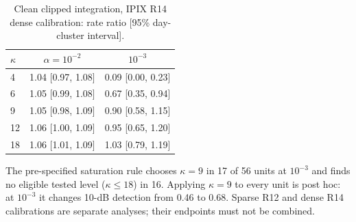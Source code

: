 \documentclass[10pt]{article}
\begin{document}
\begin{table}[htbp]
\centering\small\setlength{\tabcolsep}{4pt}
\caption{Clean clipped integration, IPIX R14 dense calibration: rate ratio [95\% day-cluster interval].}\label{tab:clip_scan}
\begin{tabular}{lcc}
\toprule
$\kappa$ & $\alpha=10^{-2}$ & $10^{-3}$ \\
\midrule
4 & 1.04 [0.97, 1.08] & 0.09 [0.00, 0.23] \\
6 & 1.05 [0.99, 1.08] & 0.67 [0.35, 0.94] \\
9 & 1.05 [0.98, 1.09] & 0.90 [0.58, 1.15] \\
12 & 1.06 [1.00, 1.09] & 0.95 [0.65, 1.20] \\
18 & 1.06 [1.01, 1.09] & 1.03 [0.79, 1.19] \\
\bottomrule
\end{tabular}
\end{table}

The pre-specified saturation rule chooses $\kappa=9$ in 17 of 56 units at $10^{-3}$ and finds no eligible tested level ($\kappa\le18$) in 16. Applying $\kappa=9$ to every unit is post hoc: at $10^{-3}$ it changes 10-dB detection from 0.46 to 0.68. Sparse R12 and dense R14 calibrations are separate analyses; their endpoints must not be combined.
\end{document}
